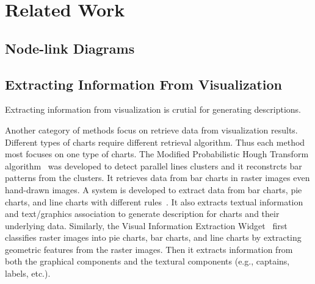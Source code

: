 \section{Related Work}\label{sec:relatedwork}
\subsection{Node-link Diagrams}
\subsection{Extracting Information From Visualization}
Extracting information from visualization is crutial for generating descriptions.

Another category of methods focus on retrieve data from visualization results.
Different types of charts require different retrieval algorithm.
Thus each method most focuses on one type of charts.
The Modified Probabilistic Hough Transform algorithm~\cite{DBLP:conf/icip/ZhouT00} was developed to detect parallel lines clusters and it reconstrcts bar patterns from the clusters. It retrieves data from bar charts in raster images even hand-drawn images. 
A system is developed to extract data from bar charts, pie charts, and line charts with different rules~\cite{DBLP:conf/doceng/HuangT07}. It also extracts textual information and text/graphics association to generate description for charts and their underlying data.
Similarly, the Visual Information Extraction Widget~\cite{DBLP:conf/icip/GaoZB12} first classifies raster images into pie charts, bar charts, and line charts by extracting geometric features from the raster images. Then it extracts information from both the graphical components and the textural components (e.g., captains, labels, etc.).



